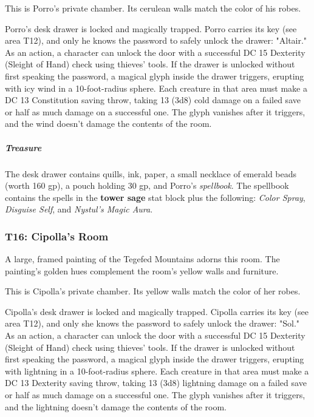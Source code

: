\documentclass[10pt,a4paper,twoside,bg=print,twocolumn,openany,nodeprecatedcode]{dndbook}
\begin{document}
This is Porro's private chamber. Its cerulean walls match the color of his robes.

Porro's desk drawer is locked and magically trapped. Porro carries its key (see area T12), and only he knows the password to safely unlock the drawer: "Altair." As an action, a character can unlock the door with a successful DC 15 Dexterity (Sleight of Hand) check using thieves' tools. If the drawer is unlocked without first speaking the password, a magical glyph inside the drawer triggers, erupting with icy wind in a 10-foot-radius sphere. Each creature in that area must make a DC 13 Constitution saving throw, taking 13 (3d8) cold damage on a failed save or half as much damage on a successful one. The glyph vanishes after it triggers, and the wind doesn't damage the contents of the room.

\subparagraph{Treasure}
The desk drawer contains quills, ink, paper, a small necklace of emerald beads (worth 160 gp), a pouch holding 30 gp, and Porro's \textit{spellbook}. The spellbook contains the spells in the \textbf{tower sage} stat block plus the following: \textit{Color Spray}, \textit{Disguise Self}, and \textit{Nystul's Magic Aura}.

\subsubsection{T16: Cipolla's Room}
\begin{DndReadAloud}{}
A large, framed painting of the Tegefed Mountains adorns this room. The painting's golden hues complement the room's yellow walls and furniture.

\end{DndReadAloud}

This is Cipolla's private chamber. Its yellow walls match the color of her robes.

Cipolla's desk drawer is locked and magically trapped. Cipolla carries its key (see area T12), and only she knows the password to safely unlock the drawer: "Sol." As an action, a character can unlock the door with a successful DC 15 Dexterity (Sleight of Hand) check using thieves' tools. If the drawer is unlocked without first speaking the password, a magical glyph inside the drawer triggers, erupting with lightning in a 10-foot-radius sphere. Each creature in that area must make a DC 13 Dexterity saving throw, taking 13 (3d8) lightning damage on a failed save or half as much damage on a successful one. The glyph vanishes after it triggers, and the lightning doesn't damage the contents of the room.
\end{document}
